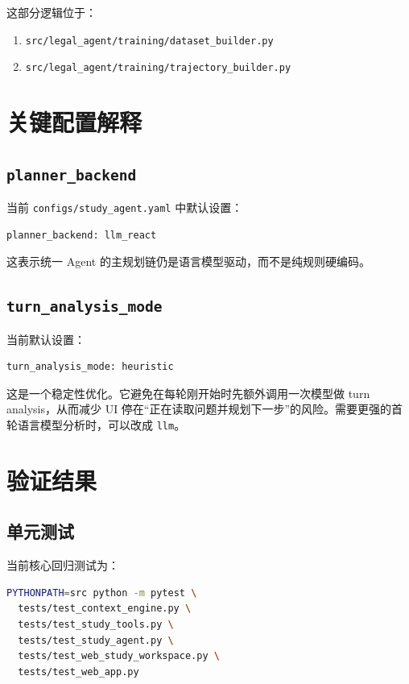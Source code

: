 \documentclass[12pt]{ctexart}
\begin{document}
这部分逻辑位于：

\begin{enumerate}
  \item \texttt{src/legal\_agent/training/dataset\_builder.py}
  \item \texttt{src/legal\_agent/training/trajectory\_builder.py}
\end{enumerate}

\section{关键配置解释}

\subsection{\texttt{planner\_backend}}

当前 \texttt{configs/study\_agent.yaml} 中默认设置：

\begin{lstlisting}[language=bash]
planner_backend: llm_react
\end{lstlisting}

这表示统一 Agent 的主规划链仍是语言模型驱动，而不是纯规则硬编码。

\subsection{\texttt{turn\_analysis\_mode}}

当前默认设置：

\begin{lstlisting}[language=bash]
turn_analysis_mode: heuristic
\end{lstlisting}

这是一个稳定性优化。它避免在每轮刚开始时先额外调用一次模型做 turn analysis，从而减少 UI 停在“正在读取问题并规划下一步”的风险。需要更强的首轮语言模型分析时，可以改成 \texttt{llm}。

\section{验证结果}

\subsection{单元测试}

当前核心回归测试为：

\begin{lstlisting}[language=bash]
PYTHONPATH=src python -m pytest \
  tests/test_context_engine.py \
  tests/test_study_tools.py \
  tests/test_study_agent.py \
  tests/test_web_study_workspace.py \
  tests/test_web_app.py
\end{lstlisting}
\end{document}

